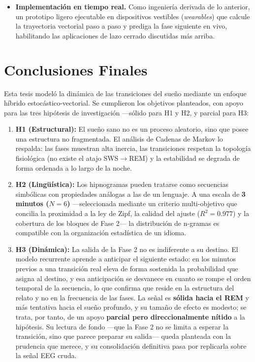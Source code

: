 \begin{itemize}
    \item \textbf{Implementación en tiempo real.} Como ingeniería derivada de lo anterior, un prototipo ligero ejecutable en dispositivos vestibles (\textit{wearables}) que calcule la trayectoria vectorial paso a paso y prediga la fase siguiente en vivo, habilitando las aplicaciones de lazo cerrado discutidas más arriba.
\end{itemize}

\clearpage
\section{Conclusiones Finales}

Esta tesis modeló la dinámica de las transiciones del sueño mediante un enfoque híbrido estocástico-vectorial. Se cumplieron los objetivos planteados, con apoyo para las tres hipótesis de investigación ---sólido para H1 y H2, y parcial para H3:

\begin{enumerate}
    \item \textbf{H1 (Estructural):} El sueño sano no es un proceso aleatorio, sino que posee una estructura no fragmentada. El análisis de Cadenas de Markov lo respalda: las fases muestran alta inercia, las transiciones respetan la topología fisiológica (no existe el atajo SWS$\rightarrow$REM) y la estabilidad se degrada de forma ordenada a lo largo de la noche.

    \item \textbf{H2 (Lingüística):} Los hipnogramas pueden tratarse como secuencias simbólicas con propiedades análogas a las de un lenguaje. A una escala de \textbf{3 minutos ($N=6$)} ---seleccionada mediante un criterio multi-objetivo que concilia la proximidad a la ley de Zipf, la calidad del ajuste ($R^2 = 0.977$) y la cobertura de los bloques de Fase 2--- la distribución de n-gramas es compatible con la organización estadística de un idioma.

    \item \textbf{H3 (Dinámica):} La salida de la Fase 2 no es indiferente a su destino. El modelo recurrente aprende a anticipar el siguiente estado: en los minutos previos a una transición real eleva de forma sostenida la probabilidad que asigna al destino, y esa anticipación se desvanece en cuanto se rompe el orden temporal de la secuencia, lo que confirma que reside en la estructura del relato y no en la frecuencia de las fases. La señal es \textbf{sólida hacia el REM} y más tentativa hacia el sueño profundo, y su tamaño de efecto es modesto; se trata, por tanto, de un apoyo \textbf{parcial pero direccionalmente nítido} a la hipótesis. Su lectura de fondo ---que la Fase 2 no se limita a esperar la transición, sino que parece preparar su salida--- queda planteada con la prudencia que merece, y su consolidación definitiva pasa por replicarla sobre la señal EEG cruda.
\end{enumerate}

